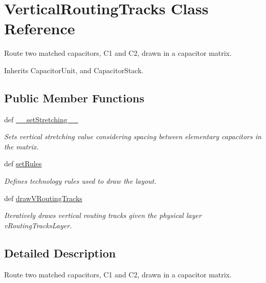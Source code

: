 \hypertarget{classpython_1_1CapacitorVRTracks_1_1VerticalRoutingTracks}{\section{Vertical\-Routing\-Tracks Class Reference}
\label{classpython_1_1CapacitorVRTracks_1_1VerticalRoutingTracks}
}


Route two matched capacitors, C1 and C2, drawn in a capacitor matrix.  




Inherits Capacitor\-Unit, and Capacitor\-Stack.

\subsection*{Public Member Functions}
\begin{DoxyCompactItemize}
\item 
def \hyperlink{classpython_1_1CapacitorVRTracks_1_1VerticalRoutingTracks_a42e286a4157e638ddb3d96ce7c47dece}{\-\_\-\-\_\-set\-Stretching\-\_\-\-\_\-}
\begin{DoxyCompactList}\small\item\em Sets vertical stretching value considering spacing between elementary capacitors in the matrix. \end{DoxyCompactList}\item 
def \hyperlink{classpython_1_1CapacitorVRTracks_1_1VerticalRoutingTracks_a3b578035b1559391931dade7c2508105}{set\-Rules}
\begin{DoxyCompactList}\small\item\em Defines technology rules used to draw the layout. \end{DoxyCompactList}\item 
def \hyperlink{classpython_1_1CapacitorVRTracks_1_1VerticalRoutingTracks_ab509e7c1cfbf2826e4418a606c8982a3}{draw\-V\-Routing\-Tracks}
\begin{DoxyCompactList}\small\item\em Iteratively draws vertical routing tracks given the physical layer {\ttfamily v\-Routing\-Tracks\-Layer}. \end{DoxyCompactList}\end{DoxyCompactItemize}


\subsection{Detailed Description}
Route two matched capacitors, C1 and C2, drawn in a capacitor matrix. 

